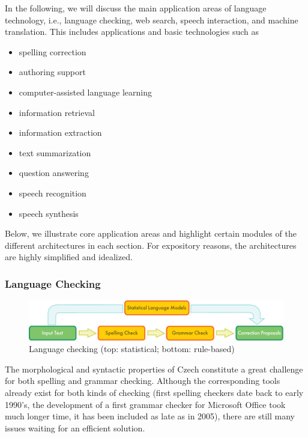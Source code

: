 \begin{multicols}{2}
In the following, we will discuss the main application areas of language technology, i.e., language checking, web search, speech interaction, and machine translation. This includes applications and basic technologies such as
\begin{itemize}
  \item spelling correction
  \item authoring support
  \item computer-assisted language learning
  \item information retrieval
  \item information extraction
  \item text summarization
  \item question answering
  \item speech recognition
  \item speech synthesis
\end{itemize}
Below, we illustrate core application areas and highlight certain modules of the different architectures in each section. For expository reasons, the architectures are highly simplified and idealized.

\subsubsection{Language Checking}

  \begin{figure}[t]
  \center
  \includegraphics[width=\textwidth]{../_media/english/language_checking}
  \caption{Language checking (top: statistical; bottom: rule-based)}
  \label{fig:langcheckingaarch_en}
\end{figure}

The morphological and syntactic properties of Czech constitute a great challenge for both spelling and grammar checking. Although the corresponding tools already exist for both kinds of checking (first spelling checkers date back to early 1990’s, the development of a first grammar checker for Microsoft Office took much longer time, it has been included as late as in 2005), there are still many issues waiting for an efficient solution.


\end{multicols}
